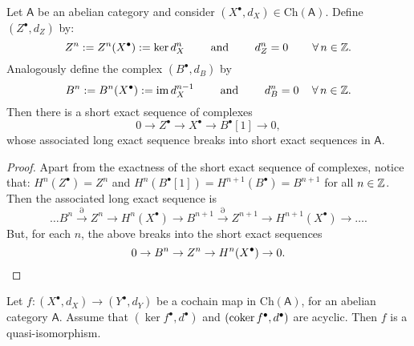 \begin{lem}
	Let $\mathsf{A}$ be an abelian category and consider
	$\left( X^{\bullet}, d_{X} \right) \in \mathrm{Ch}(\mathsf{A})$.
	Define $\left( Z^{\bullet}, d_{Z} \right)$ by:
	\begin{equation}
		Z^n := Z^n(X^\bullet) := \ker d_X^n \qquad \text{ and } \qquad
		d^n_{Z} = 0 \qquad \,\forall\, n \in \mathbb{Z}
	.\end{equation} 
	Analogously define the complex $\left( B^{\bullet}, d_{B} \right)$ by
	\begin{equation}
		B^n := B^n(X^\bullet) := \operatorname{im} d_X^{n-1} \qquad \text{ and } \qquad
		d^n_{B} = 0 \quad \,\forall\, n \in \mathbb{Z}
	.\end{equation} 
	Then there is a short exact sequence of complexes
	\begin{equation}
	0\to Z^\bullet \to X^\bullet \to
	B^\bullet[1] \to 0
	,\end{equation} 
	whose associated long exact sequence breaks into short exact sequences in $\mathsf{A}$.
\end{lem} 
\begin{proof}
	Apart from the exactness of the short exact sequence of complexes, notice that:
	$H^n(Z^\bullet) = Z^n$ and $H^n(B^\bullet[1]) = H^{n+1}(B^\bullet) = B^{n+1}$ for all $n \in \mathbb{Z}$.
	Then the associated long exact sequence is
	\begin{equation}
		\ldots B^n \xrightarrow{\partial} Z^n \to H^n(X^\bullet) \to B^{n+1} \xrightarrow{\partial}
		Z^{n+1} \to H^{n+1}(X^\bullet) \to \ldots
	.\end{equation} 
	But, for each $n$, the above breaks into the short exact sequences
	\begin{equation*}
		0 \to B^n \to Z^n \to H^n(X^\bullet) \to 0.\qedhere
	\end{equation*} 
\end{proof}

\begin{lem}
	Let $f: \left( X^{\bullet}, d_{X} \right) \to \left( Y^{\bullet}, d_{Y} \right)$
	be a cochain map in $\mathrm{Ch}(\mathsf{A})$,
	for an abelian category $\mathsf{A}$.
	Assume that $\left(\ker f^\bullet, d^\bullet\right)$ and $\left(\operatorname{coker} f^\bullet, d^\bullet\right)$
	are acyclic.
	Then $f$ is a quasi-isomorphism.
\end{lem} 

